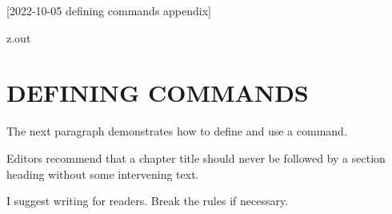 [2022-10-05 defining commands appendix]

\begin{VerbatimOut}{z.out}
\chapter{DEFINING COMMANDS}

The next paragraph demonstrates how to define and use a command.

\renewcommand{\t}[2]
{%
  Editors recommend that a #1 should never be
  followed by a #2 without some intervening text.
}

\t{chapter title}{section heading}
I suggest writing for readers.
Break the rules if necessary.
\end{VerbatimOut}

\MyIO
